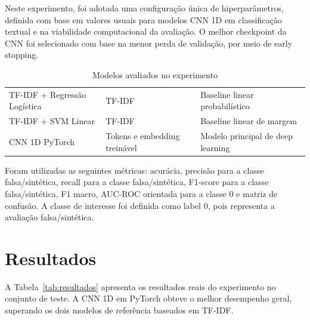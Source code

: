 \documentclass[12pt,a4paper]{article}
\begin{document}
Neste experimento, foi adotada uma configuração única de hiperparâmetros, definida com base em valores usuais para modelos CNN 1D em classificação textual e na viabilidade computacional da avaliação. O melhor checkpoint da CNN foi selecionado com base na menor perda de validação, por meio de early stopping.

\begin{table}[H]
\centering
\renewcommand{\arraystretch}{1.25}
\caption{Modelos avaliados no experimento}
\label{tab:modelos}
\begin{tabularx}{\textwidth}{@{} L{4.8cm} Y Y @{}}
\toprule
{} &  &  \\
\midrule
TF-IDF + Regressão Logística & TF-IDF & Baseline linear probabilístico \\
\addlinespace
TF-IDF + SVM Linear & TF-IDF & Baseline linear de margem \\
\addlinespace
CNN 1D PyTorch & Tokens e embedding treinável & Modelo principal de deep learning \\
\bottomrule
\end{tabularx}
\end{table}

Foram utilizadas as seguintes métricas: acurácia, precisão para a classe falsa/sintética, recall para a classe falsa/sintética, F1-score para a classe falsa/sintética, F1 macro, AUC-ROC orientada para a classe 0 e matriz de confusão. A classe de interesse foi definida como label 0, pois representa a avaliação falsa/sintética.

\section{Resultados}

A Tabela~\ref{tab:resultados} apresenta os resultados reais do experimento no conjunto de teste. A CNN 1D em PyTorch obteve o melhor desempenho geral, superando os dois modelos de referência baseados em TF-IDF.
\end{document}

